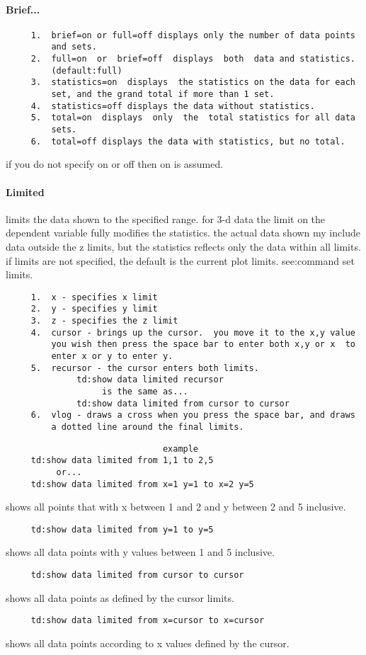 \paragraph{Brief...}
\begin{verbatim}
     1.  brief=on or full=off displays only the number of data points
         and sets.  
     2.  full=on  or  brief=off  displays  both  data and statistics.
         (default:full) 
     3.  statistics=on  displays  the statistics on the data for each
         set, and the grand total if more than 1 set.  
     4.  statistics=off displays the data without statistics.  
     5.  total=on  displays  only  the  total statistics for all data
         sets.  
     6.  total=off displays the data with statistics, but no total.  
\end{verbatim}
if you do not specify on or off then on is assumed.  
\paragraph{Limited}
limits the data shown to the specified range.  for 3-d data the limit
on the dependent variable fully modifies the statistics.  the  actual
data  shown  my include data outside the z limits, but the statistics
reflects only  the  data  within  all  limits.   if  limits  are  not
specified,    the    default    is    the    current   plot   limits.
see:command set limits.  
\begin{verbatim}
     1.  x - specifies x limit 
     2.  y - specifies y limit 
     3.  z - specifies the z limit 
     4.  cursor - brings up the cursor.  you move it to the x,y value
         you wish then press the space bar to enter both x,y or x  to
         enter x or y to enter y.  
     5.  recursor - the cursor enters both limits.  
              td:show data limited recursor 
                   is the same as...  
              td:show data limited from cursor to cursor 
     6.  vlog - draws a cross when you press the space bar, and draws
         a dotted line around the final limits.  
\end{verbatim}

\begin{verbatim}
                               example
     td:show data limited from 1,1 to 2,5 
          or...  
     td:show data limited from x=1 y=1 to x=2 y=5 
\end{verbatim}
shows  all  points  that with x between 1 and 2 and y between 2 and 5
inclusive.  
\begin{verbatim}
     td:show data limited from y=1 to y=5 
\end{verbatim}
shows all data points with y values between 1 and 5 inclusive.  
\begin{verbatim}
     td:show data limited from cursor to cursor 
\end{verbatim}
shows all data points as defined by the cursor limits.  
\begin{verbatim}
     td:show data limited from x=cursor to x=cursor 
\end{verbatim}
shows all data points according to x values defined by the cursor.  
